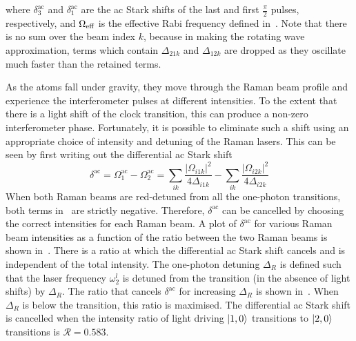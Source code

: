 where \(\delta_3^\text{ac}\) and \(\delta_1^\text{ac}\) are the ac
Stark shifts of the last and first \(\frac{\pi}{2}\) pulses,
respectively, and $\Omega_\textnormal{eff}$ is the effective Rabi
frequency defined in~. Note that there
is no sum over the beam index $k$, because in making the rotating wave
approximation, terms which contain $\Delta_{21k}$ and $\Delta_{12k}$
are dropped as they oscillate much faster than the retained terms. 
\par\noindent
As the atoms fall
under gravity, they move through the Raman beam profile and experience
the interferometer pulses at different intensities. To the extent that
there is a light shift of the clock transition, this can produce a
non-zero interferometer phase. Fortunately, it is possible
to eliminate such a shift using an appropriate choice
of intensity and detuning of the Raman lasers. This can be seen by
first writing out the differential ac Stark shift
\begin{equation}
  \delta^\text{ac} = \Omega_1^\text{ac} - \Omega_2^\text{ac} = \sum_{ik}
  \frac{\lvert\Omega_{i1k}\rvert^2}{4\Delta_{i1k}} - \sum_{ik}
  \frac{\lvert\Omega_{i2k}\rvert^2}{4\Delta_{i2k}} 
  \label{eq:diff_shift}
\end{equation}
When both Raman beams are red-detuned from
all the one-photon transitions, both terms
in~ are strictly negative. Therefore,
\(\delta^\text{ac}\) can be cancelled by choosing the correct
intensities for each Raman beam. A plot of \(\delta^{\text{ac}}\)
for various Raman beam intensities as a function of the ratio between
the two Raman beams is shown in~. There
is a ratio at which the differential ac Stark shift cancels and is
independent of the total intensity. The one-photon detuning $\Delta_R$
is defined such that the laser frequency $\omega_2^l$ is detuned from
the  transition (in the absence of light shifts) by
$\Delta_R$. The ratio that cancels
\(\delta^\text{ac}\) for increasing \(\Delta_R\) is shown
in~. When \(\Delta_R\) is
 below the  transition, this
ratio is maximised. The differential ac Stark shift is cancelled when
the intensity ratio of light driving \(\ket{1,0}\) transitions to
\(\ket{2,0}\) transitions is \(\mathcal{R} = 0.583\). 
